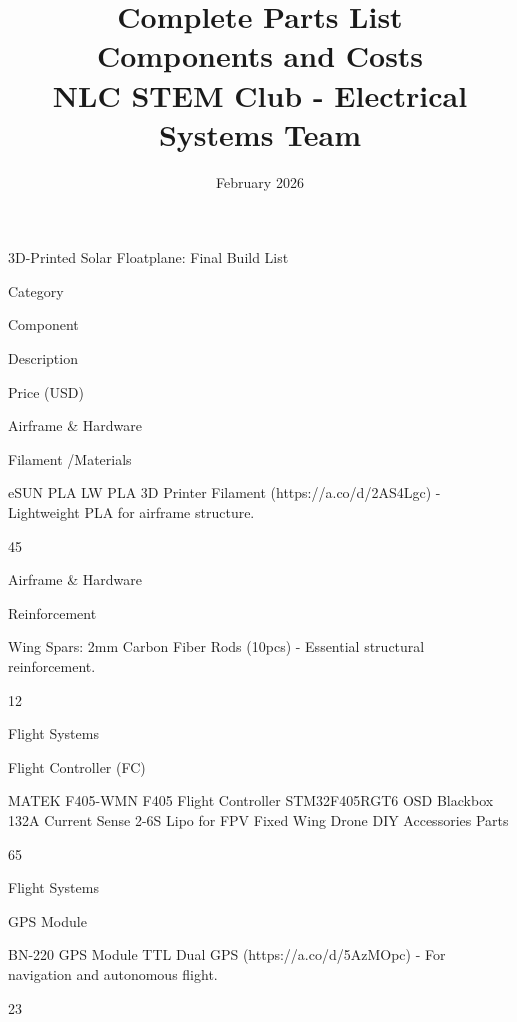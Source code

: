 \documentclass[11pt,letterpaper]{article}
\title{\Huge\textbf{Complete Parts List}\\
\Large Components and Costs\\
\large NLC STEM Club - Electrical Systems Team}
\author{February 2026}
\date{}
\begin{document}
\maketitle
\thispagestyle{empty}
\newpage
3D-Printed Solar Floatplane: Final Build List\par

Category\par

Component\par

Description\par

Price (USD)\par

Airframe \& Hardware\par

Filament /Materials\par

eSUN PLA LW PLA 3D Printer Filament (https://a.co/d/2AS4Lgc) - Lightweight PLA for airframe structure.\par

45\par

Airframe \& Hardware\par

Reinforcement\par

Wing Spars: 2mm Carbon Fiber Rods (10pcs) - Essential structural reinforcement.\par

12\par

Flight Systems\par

Flight Controller (FC)\par

MATEK F405-WMN F405 Flight Controller STM32F405RGT6 OSD Blackbox 132A Current Sense 2-6S Lipo for FPV Fixed Wing Drone DIY Accessories Parts\par

65\par

Flight Systems\par

GPS Module\par

BN-220 GPS Module TTL Dual GPS (https://a.co/d/5AzMOpc) - For navigation and autonomous flight.\par

23\par
\end{document}
